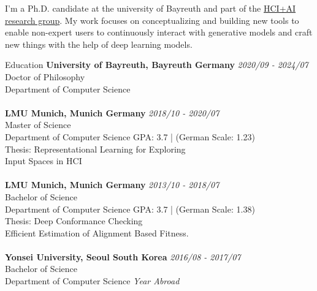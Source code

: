 \documentclass{resume} %
\begin{document}
I'm a Ph.D. candidate at the university of Bayreuth and part of 
the \href{https://www.hciai.uni-bayreuth.de/en/index.html}{HCI+AI research group}.
My work focuses on conceptualizing and building new tools to enable non-expert users to continuously
interact with generative models and craft new things with the help of deep learning models.


\begin{rSection}{Education}
{\bf University of Bayreuth, Bayreuth Germany } \hfill {\em 2020/09 - 2024/07} 
\\ Doctor of Philosophy
\\ Department of Computer Science \\
\\
{\bf LMU Munich, Munich Germany } \hfill {\em 2018/10 - 2020/07} 
\\ Master of Science
\\ Department of Computer Science \hfill { GPA: 3.7 | (German Scale: 1.23) }
\\ Thesis: Representational Learning for Exploring\\Input Spaces in HCI\\
\\{\bf LMU Munich, Munich Germany} \hfill {\em 2013/10 - 2018/07} 
\\ Bachelor of Science
\\ Department of Computer Science \hfill { GPA: 3.7 | (German Scale: 1.38)}
\\ Thesis: Deep Conformance Checking \\ Efficient Estimation of Alignment Based Fitness.\\
\\{\bf Yonsei University, Seoul South Korea} \hfill {\em 2016/08 - 2017/07} 
\\ Bachelor of Science
\\ Department of Computer Science \hfill {\em Year Abroad} 

\end{rSection}

\end{document}
